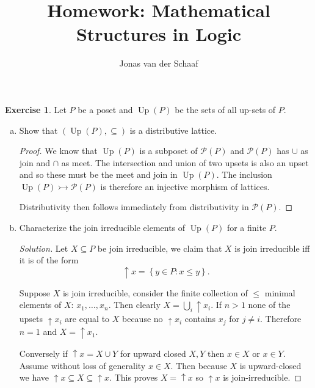 \documentclass{article}
\title{Homework: Mathematical Structures in Logic}
\author{Jonas van der Schaaf}
\date{}
\newcommand{\powset}{\mathcal{P}}
\newcommand{\set}[1]{\left\{#1\right\}}
\newcommand{\setwith}[2]{\set{#1:#2}}
\renewcommand{\qedsymbol}{\raisebox{-0.5cm}{}}
\DeclareMathOperator{\Up}{Up}
\newenvironment{solution}{\begin{proof}[Solution]\renewcommand\qedsymbol{}}{\end{proof}}
\theoremstyle{definition}
\newtheorem{question}{Exercise}
\begin{document}
\maketitle

\begin{question}
    Let \(P\) be a poset and \(\Up(P)\) be the sets of all up-sets of \(P\).

    \begin{enumerate}[a)]
        \item Show that \((\Up(P),\subseteq)\) is a distributive lattice.

              \begin{proof}
                  We know that \(\Up(P)\) is a subposet of \(\powset(P)\) and
                  \(\powset(P)\) has \(\cup\) as join and \(\cap\) as meet. The
                  intersection and union of two upsets is also an upset and so
                  these must be the meet and join in \(\Up(P)\). The inclusion
                  \(\Up(P)\rightarrowtail\powset(P)\) is therefore an injective
                  morphism of lattices.

                  Distributivity then follows immediately from distributivity
                  in \(\powset(P)\).
                  \qedhere
              \end{proof}

        \item Characterize the join irreducible elements of \(\Up(P)\) for a
              finite \(P\).

              \begin{solution}
                  Let \(X\subseteq P\) be join irreducible, we claim that
                  \(X\) is join irreducible iff it is of the form
                  \[
                      \uparrow x=\setwith{y\in P}{x\leq y}.
                  \]

                  Suppose \(X\) is join irreducible, consider the finite
                  collection of \(\leq\) minimal elements of \(X\):
                  \(x_{1},\ldots,x_{n}\). Then clearly \(X=\bigcup_{i}\uparrow
                  x_{i}\). If \(n>1\) none of the upsets \(\uparrow x_{i}\) are
                  equal to \(X\) because no \(\uparrow x_{i}\) contains
                  \(x_{j}\) for \(j\neq i\). Therefore \(n=1\) and \(X=\uparrow
                  x_{1}\).

                  Conversely if \(\uparrow x=X\cup Y\) for upward closed \(X,Y\)
                  then \(x\in X\) or \(x\in Y\). Assume without loss of
                  generality \(x\in X\). Then because \(X\) is upward-closed we
                  have \(\uparrow x\subseteq X\subseteq \uparrow x\). This
                  proves \(X=\uparrow x\) so \(\uparrow x\) is join-irreducible.
              \end{solution}
    \end{enumerate}
\end{question}
\end{document}
